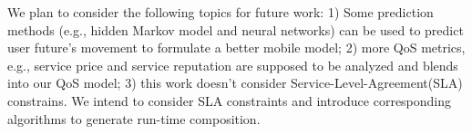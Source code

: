 \documentclass[10pt,journal,compsoc]{IEEEtran}
\begin{document}
We plan to consider the following topics for future work: 1) Some prediction methods (e.g., hidden Markov model and neural networks) can be used to predict user future's movement to formulate a better mobile model; 2) more QoS metrics, e.g., service price and service reputation are supposed to be analyzed and blends into our QoS model; 3) this work doesn't consider Service-Level-Agreement(SLA) constrains. We intend to consider SLA constraints and introduce corresponding algorithms to generate run-time composition.

​		
​	





\end{document}
